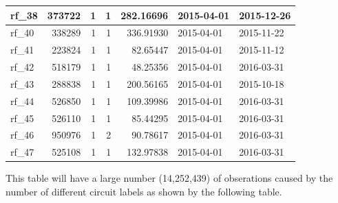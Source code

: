 \documentclass[]{article}
\begin{document}
\begin{table}
\begin{tabular}[t]{l|r|r|r|r|l|l}
\hline
rf\_38 & 373722 & 1 & 1 & 282.16696 & 2015-04-01 & 2015-12-26\\
\hline
rf\_40 & 338289 & 1 & 1 & 336.91930 & 2015-04-01 & 2015-11-22\\
\hline
rf\_41 & 223824 & 1 & 1 & 82.65447 & 2015-04-01 & 2015-11-12\\
\hline
rf\_42 & 518179 & 1 & 1 & 48.25356 & 2015-04-01 & 2016-03-31\\
\hline
rf\_43 & 288838 & 1 & 1 & 200.56165 & 2015-04-01 & 2015-10-18\\
\hline
rf\_44 & 526850 & 1 & 1 & 109.39986 & 2015-04-01 & 2016-03-31\\
\hline
rf\_45 & 526110 & 1 & 1 & 85.44295 & 2015-04-01 & 2016-03-31\\
\hline
rf\_46 & 950976 & 1 & 2 & 90.78617 & 2015-04-01 & 2016-03-31\\
\hline
rf\_47 & 525108 & 1 & 1 & 132.97838 & 2015-04-01 & 2016-03-31\\
\hline
\end{tabular}
\end{table}

This table will have a large number (14,252,439) of obserations caused
by the number of different circuit labels as shown by the following
table.
\end{document}
